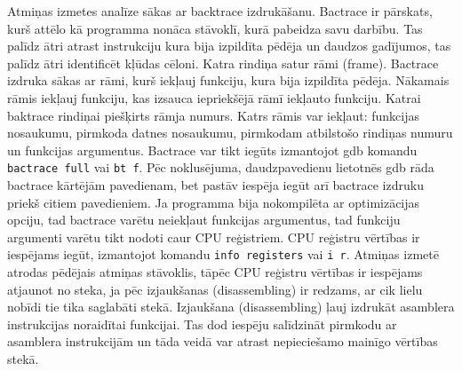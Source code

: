 Atmiņas izmetes analīze sākas ar backtrace izdrukāšanu. 
Bactrace ir pārskats, kurš attēlo kā programma nonāca stāvoklī, kurā pabeidza savu darbību.
Tas palīdz ātri atrast instrukciju kura bija izpildīta pēdēja un daudzos gadījumos, tas palīdz ātri identificēt kļūdas cēloni.
Katra rindiņa satur rāmi (frame). Bactrace izdruka sākas ar rāmi, kurš iekļauj funkciju, kura bija izpildīta pēdēja. 
Nākamais rāmis iekļauj funkciju, kas izsauca iepriekšējā rāmī iekļauto funkciju.
Katrai baktrace rindiņai piešķirts rāmja numurs. Katrs rāmis var iekļaut: funkcijas nosaukumu, pirmkoda datnes nosaukumu, pirmkodam atbilstošo rindiņas numuru un funkcijas argumentus. 
Bactrace var tikt iegūts izmantojot gdb komandu \texttt{bactrace full} vai \texttt{bt f}. 
Pēc noklusējuma, daudzpavedienu lietotnēs gdb  rāda bactrace kārtējām pavedienam, bet pastāv iespēja iegūt arī bactrace izdruku priekš citiem pavedieniem.
Ja programma bija nokompilēta ar optimizācijas opciju, tad bactrace varētu neiekļaut funkcijas argumentus, tad funkciju argumenti varētu tikt nodoti caur CPU reģistriem.
CPU reģistru vērtības ir iespējams iegūt, izmantojot komandu \texttt{info registers} vai \texttt{i r}.
Atmiņas izmetē atrodas pēdējais atmiņas stāvoklis, tāpēc CPU reģistru vērtības ir iespējams atjaunot no steka, ja pēc izjaukšanas (disassembling) ir redzams, ar cik lielu nobīdi tie tika saglabāti stekā.
Izjaukšana (disassembling) ļauj izdrukāt asamblera instrukcijas noraidītai funkcijai. 
Tas dod iespēju salīdzināt pirmkodu ar asamblera instrukcijām un tāda veidā var atrast nepieciešamo mainīgo vērtības stekā.

